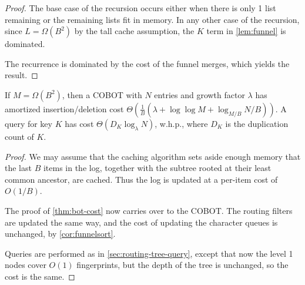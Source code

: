 
\begin{proof}
	The base case of the recursion occurs either when there is only 1 list
	remaining or the remaining lists fit in memory. In any other case of the
	recursion, since $L=\Omega(B^2)$ by the tall cache assumption, the $K$ term
	in \cref{lem:funnel} is dominated.

	The recurrence is dominated by the cost of the funnel merges, which yields
	the result.
\end{proof}

\begin{theorem}
	If $M=\Omega(B^2)$, then a COBOT with $N$ entries and growth factor
	$\lambda$ has amortized insertion/deletion cost
	$\Theta\left(\frac{1}{B}\left(\lambda + \log\log M + \log_{M/B}
	N/B\right)\right)$. A query for key $K$ has cost
	$\Theta\left(D_K\log_\lambda N\right)$, w.h.p., where $D_K$ is the
	duplication count of $K$.
\end{theorem}

\begin{proof}
	We may assume that the caching algorithm sets aside enough memory that the
	last $B$ items in the log, together with the subtree rooted at their least
	common ancestor, are cached. Thus the log is updated at a per-item cost of
	$O(1/B)$.

        The proof of \cref{thm:bot-cost} now carries over to the COBOT. The
        routing filters are updated the same way, and the cost of updating the
        character queues is unchanged, by \cref{cor:funnelsort}.

	Queries are performed as in \cref{sec:routing-tree-query}, except that now
	the level 1 nodes cover $O(1)$ fingerprints, but the depth of the tree is
	unchanged, so the cost is the same.
\end{proof}
